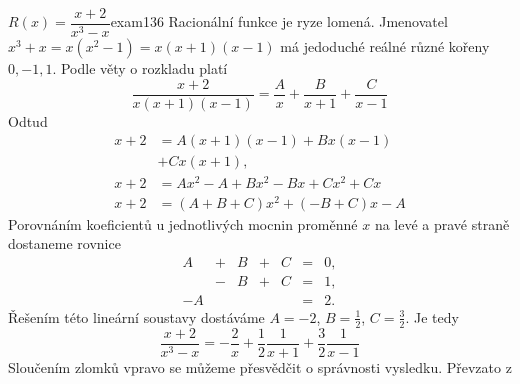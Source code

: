 \begin{mathexam}{\(R(x) = \dfrac{x + 2}{x^3 - x}\)}{exam136}
  Racionální funkce je ryze lomená. Jmenovatel \(x^3 + x = x(x^2-1) = x(x+1)(x-1)\) má jedoduché
  reálné různé kořeny \(0,-1,1\). Podle věty o rozkladu platí
  \begin{equation*}
    \dfrac{x+2}{x(x+1)(x-1)} = \dfrac{A}{x} + \dfrac{B}{x+1} + \dfrac{C}{x-1}
  \end{equation*}
  Odtud
  \begin{align}
    x+2 &= A(x+1)(x-1) + Bx(x-1)            \nonumber          \\ 
        &+ Cx(x+1),                         \label{mai:eq162}  \\
    x+2 &= Ax^2 - A +Bx^2 - Bx + Cx^2 + Cx  \nonumber          \\
    x+2 &= (A+B+C)x^2 + (-B+C)x - A         \nonumber
  \end{align}
  Porovnáním koeficientů u jednotlivých mocnin proměnné \(x\) na levé a pravé straně dostaneme
  rovnice 
  \begin{equation*}
    \begin{array}{rcrcrcl}
       A &+& B &+& C &=&0, \\
         &-& B &+& C &=&1, \\
      -A & &   & &   &=&2. 
    \end{array}   
  \end{equation*}
  Řešením této lineární soustavy dostáváme \(A = -2\), \(B = \frac{1}{2}\), \(C = \frac{3}{2}\). Je
  tedy 
  \begin{equation}\label{mai:eq163}
    \dfrac{x+2}{x^3-x} = -\dfrac{2}{x} + \dfrac{1}{2}\dfrac{1}{x+1} + \dfrac{3}{2}\dfrac{1}{x-1}
  \end{equation} 
  Sloučením zlomků vpravo se můžeme přesvědčit o správnosti vysledku. Převzato z
  \cite[p.~268]{Brabec1989}
\end{mathexam}